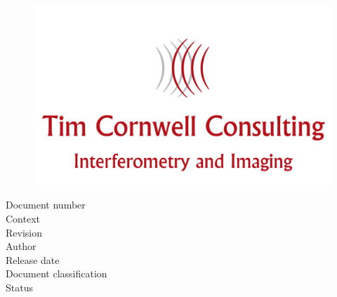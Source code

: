 \thispagestyle{empty}


\setlength{\unitlength}{1mm}


\phantom{test}
\begin{figure}[h]
  \centering
  \includegraphics[width=\textwidth]{400dpiLogo.jpg}
\end{figure}


\begin{center}
\fontsize{22}{24}\selectfont \sffamily\bigdoctitle
\end{center}

\vspace{1cm}

\noindent\normalsize{Document number \dotfill \docnr}\\
\normalsize{Context \dotfill \context}\\
\normalsize{Revision \dotfill \revision}\\
\normalsize{Author \dotfill \docauthor}\\
\normalsize{Release date \dotfill \docudate}\\
\normalsize{Document classification \dotfill \classification}\\
\normalsize{Status \dotfill \docstatus}





\newpage

\begin{center}
\signaturetable{\firstsigname}{\firstsigdesignation}{\firstsigaffiliation}
\end{center}


\begin{center}
\signaturetable{\secondsigname}{\secondsigdesignation}{\secondsigaffiliation}
\end{center}

\vspace{0.5cm}

\begin{center}
\versiontable
\end{center}

\vspace{0.5cm}

\begin{center}
\organisationtable
\end{center}


